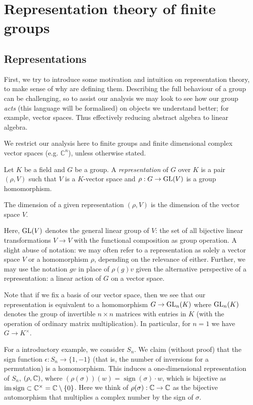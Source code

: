 \section{Representation theory of finite groups}

\subsection{Representations}

First, we try to introduce some motivation and intuition on representation theory, to make sense of why are defining them. Describing the full behaviour of a group can be challenging, so to assist our analysis we may look to see how our group \emph{acts} (this language will be formalised) on objects we understand better; for example, vector spaces. Thus effectively reducing abstract algebra to linear algebra.

We restrict our analysis here to finite groups and finite dimensional complex vector spaces (e.g. $\mathbb C^n$), unless otherwise stated.

\begin{definition}[Representation]
  Let $K$ be a field and $G$ be a group. A \emph{representation} of $G$ over $K$ is a pair $(\rho, V)$ such that $V$ is a $K$-vector space and $\rho: G \to \operatorname{GL}(V)$ is a group homomorphism.
\end{definition}

The dimension of a given representation $(\rho, V)$ is the dimension of the vector space $V$.

Here, $\operatorname{GL}(V)$ denotes the general linear group of $V$: the set of all bijective linear transformations $V \to V$ with the functional composition as group operation. A slight abuse of notation: we may often refer to a representation as solely a vector space $V$ or a homomorphism $\rho$, depending on the relevance of either. Further, we may use the notation $gv$ in place of $\rho(g)v$ given the alternative perspective of a representation: a linear action of $G$ on a vector space.

Note that if we fix a basis of our vector space, then we see that our representation is equivalent to a homomorphism $G \to \operatorname{GL}_n(K)$ where $\operatorname{GL}_n(K)$ denotes the group of invertible $n \times n$ matrices with entries in $K$ (with the operation of ordinary matrix multiplication). In particular, for $n =1$ we have $G \to K^\times$.

\begin{example}
  For a introductory example, we consider $S_n$. We claim (without proof) that the sign function $\epsilon: S_n \to \{1,-1\}$ (that is, the number of inversions for a permutation) is a homomorphism. This induces a one-dimensional representation of $S_n$, $(\rho, \mathbb{C})$, where $(\rho(\sigma))(w)=\operatorname{sign}(\sigma) \cdot w$, which is bijective as $\operatorname{im}\operatorname{sign} \subset \mathbb{C}^\times = \mathbb{C}\setminus\{0\}$. Here we think of $\rho(\sigma): \mathbb{C} \to \mathbb{C}$ as the bijective automorphism that multiplies a complex number by the sign of $\sigma$.
\end{example}

